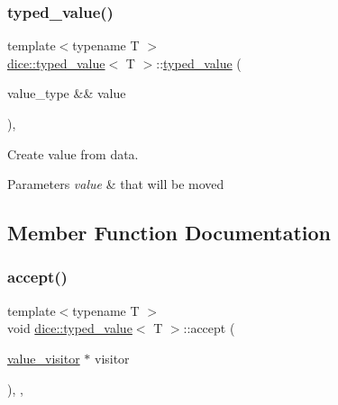 \subsubsection{\texorpdfstring{typed\+\_\+value()}{typed\_value()}\hspace{0.1cm}{\footnotesize\ttfamily [2/2]}}
{\footnotesize\ttfamily template$<$typename T $>$ \\
\mbox{\hyperlink{classdice_1_1typed__value}{dice\+::typed\+\_\+value}}$<$ T $>$\+::\mbox{\hyperlink{classdice_1_1typed__value}{typed\+\_\+value}} (\begin{DoxyParamCaption}\item[{value\+\_\+type \&\&}]{value }\end{DoxyParamCaption})\hspace{0.3cm}{\ttfamily [inline]}, {\ttfamily [explicit]}}



Create value from data. 


\begin{DoxyParams}{Parameters}
{\em value} & that will be moved \\
\hline
\end{DoxyParams}


\subsection{Member Function Documentation}
\mbox{\label{classdice_1_1typed__value_ae9563902b664c40a4b3d8a8cb201a194}} 
\subsubsection{\texorpdfstring{accept()}{accept()}}
{\footnotesize\ttfamily template$<$typename T $>$ \\
void \mbox{\hyperlink{classdice_1_1typed__value}{dice\+::typed\+\_\+value}}$<$ T $>$\+::accept (\begin{DoxyParamCaption}\item[{\mbox{\hyperlink{classdice_1_1value__visitor}{value\+\_\+visitor}} $\ast$}]{visitor }\end{DoxyParamCaption})\hspace{0.3cm}{\ttfamily [inline]}, {\ttfamily [override]}, {\ttfamily [virtual]}}




